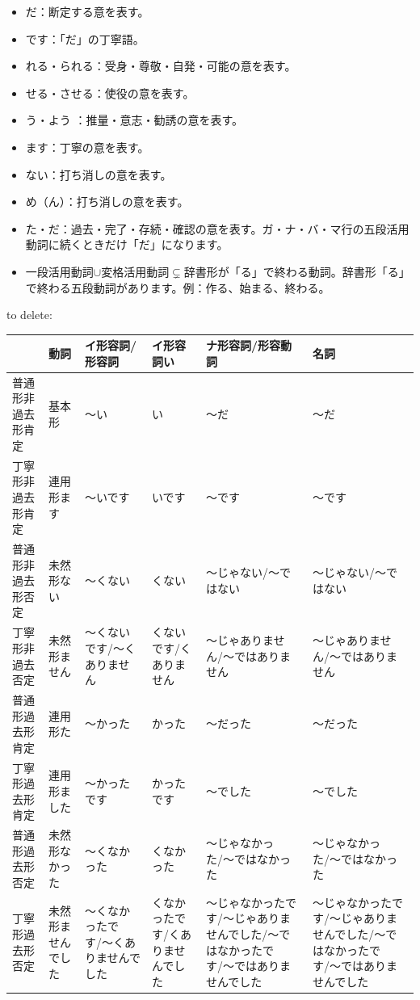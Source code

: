 \documentclass[a4paper,12pt]{article}
\begin{document}
\begin{itemize}
\item だ：断定する意を表す。
\item です：「だ」の丁寧語。
\item れる・られる：受身・尊敬・自発・可能の意を表す。
\item せる・させる：使役の意を表す。
\item う・よう ：推量・意志・勧誘の意を表す。
\item ます：丁寧の意を表す。
\item ない：打ち消しの意を表す。
\item め（ん）：打ち消しの意を表す。
\item た・だ：過去・完了・存続・確認の意を表す。ガ・ナ・バ・マ行の五段活用動詞に続くときだけ「だ」になります。
\end{itemize}
\begin{itemize}
\item 一段活用動詞$\cup$変格活用動詞$\subsetneq$辞書形が「る」で終わる動詞。辞書形「る」で終わる五段動詞があります。例：作る、始まる、終わる。
\end{itemize}

to delete:
\begin{longtable}[c]{|C{0.15\textwidth}|C{0.13\textwidth}|C{0.13\textwidth}|C{0.13\textwidth}|C{0.13\textwidth}|C{0.13\textwidth}|}
\hline
 & 動詞 & イ形容詞/形容詞 & イ形容詞い & ナ形容詞/形容動詞 & 名詞 \\\hline
普通形非過去形肯定 & 基本形 & 〜い & い & 〜だ & 〜だ \\\hline
丁寧形非過去形肯定 & 連用形ます & 〜いです & いです & 〜です & 〜です \\\hline
普通形非過去形否定 & 未然形ない & 〜くない & くない & 〜じゃない/〜ではない & 〜じゃない/〜ではない \\\hline
丁寧形非過去否定 & 未然形ません & 〜くないです/〜くありません & くないです/くありません & 〜じゃありません/〜ではありません & 〜じゃありません/〜ではありません \\\hline
普通形過去形肯定 & 連用形た & 〜かった & かった & 〜だった & 〜だった \\\hline
丁寧形過去形肯定 & 連用形ました & 〜かったです & かったです & 〜でした & 〜でした \\\hline
普通形過去形否定 & 未然形なかった & 〜くなかった & くなかった & 〜じゃなかった/〜ではなかった & 〜じゃなかった/〜ではなかった \\\hline
丁寧形過去形否定 & 未然形ませんでした & 〜くなかったです/〜くありませんでした & くなかったです/くありませんでした & 〜じゃなかったです/〜じゃありませんでした/〜ではなかったです/〜ではありませんでした & 〜じゃなかったです/〜じゃありませんでした/〜ではなかったです/〜ではありませんでした \\\hline
\end{longtable}
\end{document}
